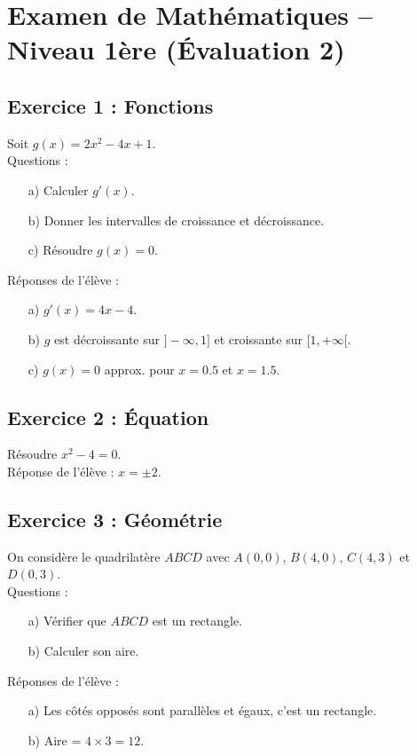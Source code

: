 \documentclass{article}
\begin{document}
\section*{Examen de Mathématiques – Niveau 1ère (Évaluation 2)}

\subsection*{Exercice 1 : Fonctions}
Soit $g(x) = 2x^2 - 4x + 1$. \\
Questions : 
\begin{enumerate}
    \item[a)] Calculer $g'(x)$.
    \item[b)] Donner les intervalles de croissance et décroissance.
    \item[c)] Résoudre $g(x) = 0$.
\end{enumerate}

Réponses de l’élève :
\begin{enumerate}
    \item[a)] $g'(x) = 4x - 4$.
    \item[b)] $g$ est décroissante sur $]-\infty, 1]$ et croissante sur $[1, +\infty[$.
    \item[c)] $g(x) = 0$ approx. pour $x = 0.5$ et $x = 1.5$.
\end{enumerate}

\subsection*{Exercice 2 : Équation}
Résoudre $x^2 - 4 = 0$. \\
Réponse de l’élève : $x = \pm 2$.

\subsection*{Exercice 3 : Géométrie}
On considère le quadrilatère $ABCD$ avec $A(0,0)$, $B(4,0)$, $C(4,3)$ et $D(0,3)$. \\
Questions :
\begin{enumerate}
    \item[a)] Vérifier que $ABCD$ est un rectangle.
    \item[b)] Calculer son aire.
\end{enumerate}

Réponses de l’élève :
\begin{enumerate}
    \item[a)] Les côtés opposés sont parallèles et égaux, c’est un rectangle.
    \item[b)] Aire = $4 \times 3 = 12$.
\end{enumerate}
\end{document}
